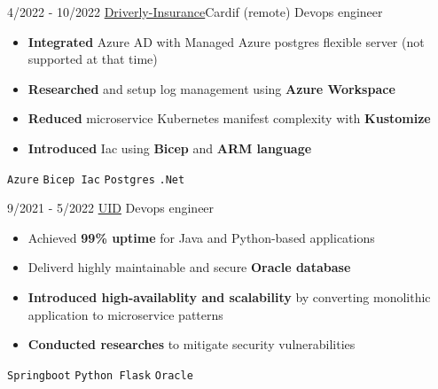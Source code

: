 \documentclass[9pt]{developercv} %
\begin{document}
\begin{entrylist}
    \entry
    {4/2022 - 10/2022}
    {\href{https://driverly.co.uk}{Driverly-Insurance}\newline\small\textnormal{Cardif (remote)}}
    {Devops engineer}
    {\vspace{-6pt}
    \begin{itemize}[itemsep=2pt,topsep=0pt,parsep=0pt,partopsep=0pt, leftmargin=-1pt]
        \item{\textbf{Integrated} Azure AD with Managed Azure postgres flexible server (not supported at that time)}
        \item{\textbf{Researched} and setup log management using \textbf{Azure Workspace}}
        \item{\textbf{Reduced} microservice Kubernetes manifest complexity with \textbf{Kustomize}}
        \item{\textbf{Introduced} Iac using \textbf{Bicep} and \textbf{ARM language}}
    \end{itemize}
    {\vspace{2pt}}
    \texttt{Azure} \slashsep \texttt{Bicep Iac} \slashsep \texttt{Postgres} \slashsep \texttt{.Net}}
\end{entrylist}
\begin{center}
    \hdashrule[0.2ex]{\linewidth}{0.5pt}{.8mm}
\end{center}
\vspace{5pt}
\begin{entrylist}
    \entry
    {9/2021 - 5/2022}
    {\href{https://u-id.net}{UID}}
    {Devops engineer}
    {\vspace{-6pt}
    \begin{itemize}[itemsep=2pt,topsep=0pt,parsep=0pt,partopsep=0pt, leftmargin=-1pt]
        \item{Achieved \textbf{99\% uptime} for Java and Python-based applications}
        \item{Deliverd highly maintainable and secure \textbf{Oracle database}}
        \item{\textbf{Introduced high-availablity and scalability} by converting monolithic application to microservice patterns}
        \item{\textbf{Conducted researches} to mitigate security vulnerabilities}
    \end{itemize}
    {\vspace{2pt}}
    \texttt{Springboot} \slashsep \texttt{Python Flask} \slashsep \texttt{Oracle}}
\end{entrylist}
\end{document}
